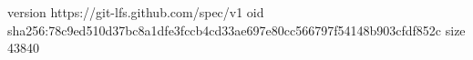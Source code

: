 version https://git-lfs.github.com/spec/v1
oid sha256:78c9ed510d37bc8a1dfe3fccb4cd33ae697e80cc566797f54148b903cfdf852c
size 43840
